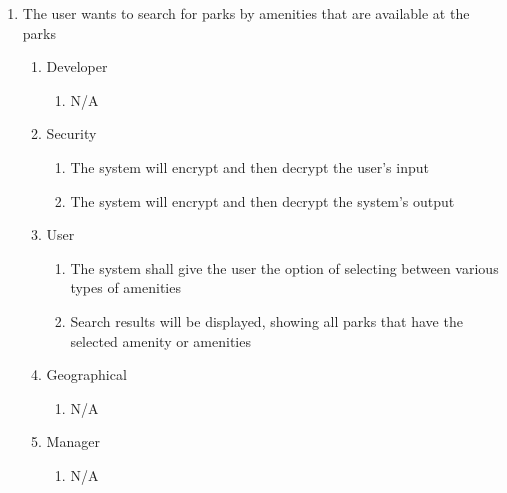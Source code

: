 \documentclass[titlepage]{article}
\begin{document}
\begin{enumerate}[{BE}1.]
	\item The user wants to search for parks by amenities that are available at the parks
    \begin{enumerate}[{VP\theenumi}.1]
        \item Developer
            \begin{enumerate}
                \item N/A
            \end{enumerate}
        \item Security
            \begin{enumerate}
                \item The system will encrypt and then decrypt the user's input
                \item The system will encrypt and then decrypt the system's output
            \end{enumerate}
        \item User
            \begin{enumerate}
                \item The system shall give the user the option of selecting between various types
                of amenities
                \item Search results will be displayed, showing all parks that have the selected
                amenity or amenities
            \end{enumerate}
        \item Geographical
            \begin{enumerate}
                \item N/A
            \end{enumerate}
        \item Manager
            \begin{enumerate}
                \item N/A
            \end{enumerate}
    \end{enumerate}


\end{enumerate}
\end{document}
